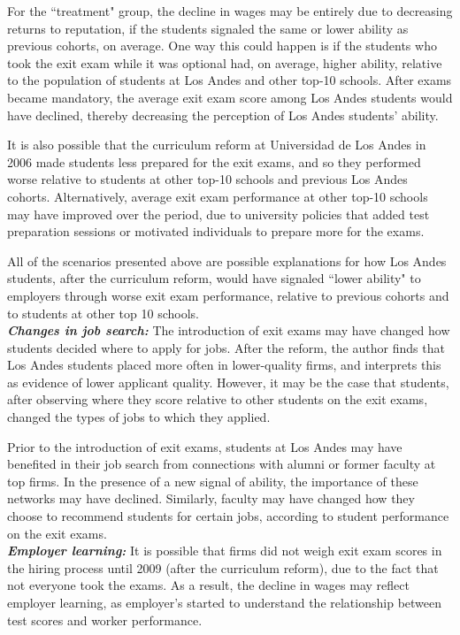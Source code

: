 \documentclass[a4paper, 11pt]{article}
\begin{document}
For the ``treatment" group, the decline in wages may be entirely due to decreasing returns to reputation, if the students signaled the same or lower ability as previous cohorts, on average.  One way this could happen is if the students who took the exit exam while it was optional had, on average, higher ability, relative to the population of students at Los Andes and other top-10 schools.  After exams became mandatory, the average exit exam score among Los Andes students would have  declined, thereby decreasing the perception of Los Andes students' ability.  

It is also possible that the curriculum reform at Universidad de Los Andes in 2006 made students less prepared for the exit exams, and so they performed worse relative to students at other top-10 schools and previous Los Andes cohorts.  Alternatively, average exit exam performance at other top-10 schools may have improved over the period, due to university policies that added test preparation sessions or motivated individuals to prepare more for the exams.

All of the scenarios presented above are possible explanations for how Los Andes students, after the curriculum reform, would have signaled ``lower ability" to employers through worse exit exam performance, relative to previous cohorts and to students at other top 10 schools.
  \\
  
\noindent \textbf{\textit{Changes in job search:}} The introduction of exit exams may have changed how students decided where to apply for jobs.  After the reform, the author finds that Los Andes students placed more often in lower-quality firms, and interprets this as evidence of lower applicant quality.  However, it may be the case that students, after observing where they score relative to other students on the exit exams, changed the types of jobs to which they applied.

Prior to the introduction of exit exams, students at Los Andes may have benefited in their job search from connections with alumni or former faculty at top firms.  In the presence of a new signal of ability, the importance of these networks may have declined.  Similarly, faculty may have changed how they choose to recommend students for certain jobs, according to student  performance on the exit exams. 
\\
 
\noindent \textbf{\textit{Employer learning:}} It is possible that firms did not weigh exit exam scores in the hiring process until 2009 (after the curriculum reform), due to the fact that not everyone took the exams.  As a result, the decline in wages may reflect employer learning, as employer's started to understand the relationship between test scores and worker performance. 
  \\
  
\end{document}
